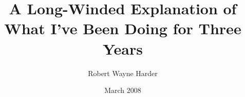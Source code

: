 \title{A Long-Winded Explanation of What I've Been Doing for Three Years}
\author{Robert Wayne Harder}
\date{March 2008}



